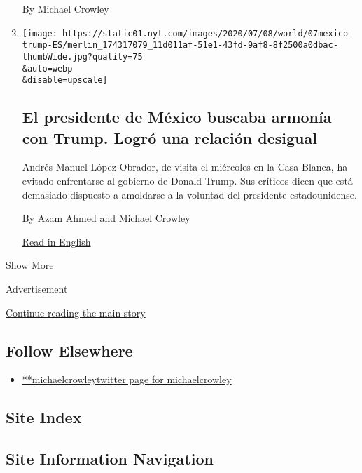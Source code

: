 \begin{enumerate}
  By Michael Crowley
\item
  \href{/es/2020/07/08/espanol/mundo/amlo-trump-washington.html}{}

  \texttt{[image: https://static01.nyt.com/images/2020/07/08/world/07mexico-trump-ES/merlin\_174317079\_11d011af-51e1-43fd-9af8-8f2500a0dbac-thumbWide.jpg?quality=75\\\&auto=webp\\\&disable=upscale]}

  \hypertarget{el-presidente-de-muxe9xico-buscaba-armonuxeda-con-trump-logruxf3-una-relaciuxf3n-desigual}{%
  \subsection{El presidente de México buscaba armonía con Trump. Logró
  una relación
  desigual}\label{el-presidente-de-muxe9xico-buscaba-armonuxeda-con-trump-logruxf3-una-relaciuxf3n-desigual}}

  Andrés Manuel López Obrador, de visita el miércoles en la Casa Blanca,
  ha evitado enfrentarse al gobierno de Donald Trump. Sus críticos dicen
  que está demasiado dispuesto a amoldarse a la voluntad del presidente
  estadounidense.

  By Azam Ahmed and Michael Crowley

  \href{https://www.nytimes.com/2020/07/08/world/americas/mexico-amlo-trump-meeting.html}{Read
  in English}
\end{enumerate}

Show More

Advertisement

\protect\hyperlink{after-mid2}{Continue reading the main story}

\hypertarget{follow-elsewhere}{%
\subsection{Follow Elsewhere}\label{follow-elsewhere}}

\begin{itemize}
\tightlist
\item
  \href{https://twitter.com/michaelcrowley}{**michaelcrowleytwitter page
  for michaelcrowley}
\end{itemize}

\hypertarget{site-index}{%
\subsection{Site Index}\label{site-index}}

\hypertarget{site-information-navigation}{%
\subsection{Site Information
Navigation}\label{site-information-navigation}}

